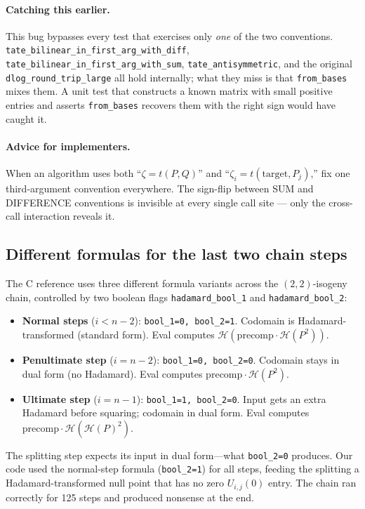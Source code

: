 \paragraph{Catching this earlier.}  This bug bypasses every test
that exercises only \emph{one} of the two conventions.
\texttt{tate\_bilinear\_in\_first\_arg\_with\_diff},
\texttt{tate\_bilinear\_in\_first\_arg\_with\_sum},
\texttt{tate\_antisymmetric}, and the original
\texttt{dlog\_round\_trip\_large} all hold internally; what they
miss is that \texttt{from\_bases} mixes them.  A unit test that
constructs a known matrix with small positive entries and asserts
\texttt{from\_bases} recovers them with the right sign would have
caught it.

\paragraph{Advice for implementers.}  When an algorithm uses both
``$\zeta = t(P, Q)$'' and ``$\zeta_i = t(\mathrm{target}, P_j)$,''
fix one third-argument convention everywhere.  The sign-flip
between SUM and DIFFERENCE conventions is invisible at every
single call site — only the cross-call interaction reveals it.

\subsection{Different formulas for the last two chain steps}
\label{sec:bug-hadamard-bool}

The C reference uses three different formula variants across the
$(2,2)$-isogeny chain, controlled by two boolean flags
\texttt{hadamard\_bool\_1} and \texttt{hadamard\_bool\_2}:
\begin{itemize}
  \item \textbf{Normal steps} ($i < n-2$): \texttt{bool\_1=0, bool\_2=1}.
    Codomain is Hadamard-transformed (standard form).
    Eval computes $\mathcal{H}(\mathrm{precomp} \cdot \mathcal{H}(P^2))$.
  \item \textbf{Penultimate step} ($i = n-2$): \texttt{bool\_1=0, bool\_2=0}.
    Codomain stays in dual form (no Hadamard).
    Eval computes $\mathrm{precomp} \cdot \mathcal{H}(P^2)$.
  \item \textbf{Ultimate step} ($i = n-1$): \texttt{bool\_1=1, bool\_2=0}.
    Input gets an extra Hadamard before squaring; codomain in dual form.
    Eval computes $\mathrm{precomp} \cdot \mathcal{H}(\mathcal{H}(P)^2)$.
\end{itemize}
The splitting step expects its input in dual form---what
\texttt{bool\_2=0} produces.  Our code used the normal-step formula
(\texttt{bool\_2=1}) for all steps, feeding the splitting a
Hadamard-transformed null point that has no zero $U_{i,j}(0)$ entry.
The chain ran correctly for 125 steps and produced nonsense at the end.

